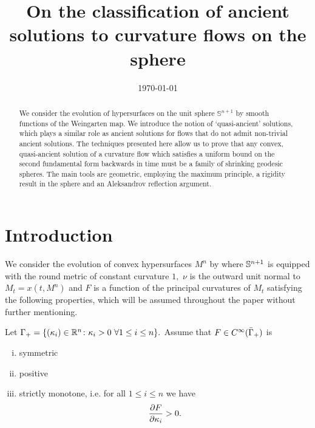 \documentclass{amsart}
\begin{document}
\title[Ancient solutions to curvature flows in the sphere]
 {On the classification of ancient solutions to curvature flows on the sphere}

\curraddr{}
\email{}
\date{\today}

\dedicatory{}
\subjclass[2010]{}
\keywords{}

\begin{abstract}
We consider the evolution of hypersurfaces on the unit sphere $\mathbb{S}^{n+1}$ by smooth functions of the Weingarten map. We introduce the notion of `quasi-ancient' solutions, which plays a similar role as ancient solutions for flows that do not admit non-trivial ancient solutions. The techniques presented here allow us to prove that any convex, quasi-ancient solution of a curvature flow which satisfies a uniform bound on the second fundamental form backwards in time must be a family of shrinking geodesic spheres. The main tools are geometric, employing the maximum principle, a rigidity result in the sphere and an Aleksandrov reflection argument.
\end{abstract}

\maketitle

\section{Introduction}
\label{sec:intro}

We consider the evolution of convex hypersurfaces $M^n$ by
where \(\S^{n+1}\) is equipped with the round metric of constant curvature $1,$ $\nu$ is the outward unit normal to $M_t=x(t,M^n)$ and $F$ is a function of the principal curvatures of $M_t$ satisfying the following properties, which will be assumed throughout the paper without further mentioning.
\begin{ass} \label{F}
Let $\G_{+}=\{(\k_i)\in\R^n\cn \k_i>0~\forall 1\leq i\leq n\}.$ Assume that $F\in C^{\8}(\-\G_{+})$ is
\begin{enumerate}[(i)]
\item{symmetric}
\item{positive}
\item{strictly monotone, i.e. for all $1\leq i\leq n$ we have
\[\fr{\del F}{\del \k_i}>0.\]}
\end{enumerate}
\end{ass}
\end{document}
